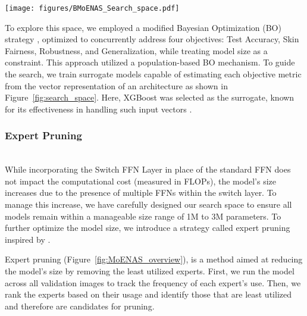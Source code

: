 \begin{figure*}[ht]
    \centering
    \texttt{[image: figures/BMoENAS\_Search\_space.pdf]}
    \caption{
Search space of MoENAS: Each candidate architecture is built on the MobileViTv2 macro-architecture, varying only in the number of experts per S-FFN layer, represented as a vector encoding the expert count for each S-FFN layer.}
    \label{fig:search_space}
\end{figure*}

To explore this space, we employed a modified Bayesian Optimization (BO) strategy \cite{white2021bananas}, optimized to concurrently address four objectives: Test Accuracy, Skin Fairness, Robustness, and Generalization, while treating model size as a constraint. This approach utilized a population-based BO mechanism\cite{pelikan2002scalability}. To guide the search, we train surrogate models capable of estimating each objective metric from the vector representation of an architecture as shown in Figure~\ref{fig:search_space}. Here, XGBoost was selected as the surrogate, known for its effectiveness in handling such input vectors \cite{benmeziane2021comprehensive}. 

\subsubsection{Expert Pruning}~\\ \label{method:expert-pruning}
%
While incorporating the Switch FFN Layer in place of the standard FFN does not impact the computational cost (measured in FLOPs), the model's size increases due to the presence of multiple FFNs within the switch layer. To manage this increase, we have carefully designed our search space to ensure all models remain within a manageable size range of 1M to 3M parameters. To further optimize the model size, we introduce a strategy called expert pruning inspired by \cite{chen2022task}.

Expert pruning (Figure~\ref{fig:MoENAS_overview}), is a method aimed at reducing the model's size by removing the least utilized experts. First, we run the model across all validation images to track the frequency of each expert's use. Then, we rank the experts based on their usage and identify those that are least utilized and therefore are candidates for pruning. 

